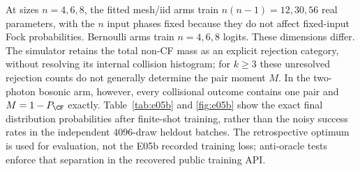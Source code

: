 At sizes $n=4,6,8$, the fitted mesh/iid arms train $n(n-1)=12,30,56$ real parameters, with the $n$ input phases fixed because they do not affect fixed-input Fock probabilities. Bernoulli arms train $n=4,6,8$ logits. These dimensions differ. The simulator retains the total non-CF mass as an explicit rejection category, without resolving its internal collision histogram; for $k\ge3$ these unresolved rejection counts do not generally determine the pair moment $M$. In the two-photon bosonic arm, however, every collisional outcome contains one pair and $M=1-P_{\CF}$ exactly. Table~\ref{tab:e05b} and \cref{fig:e05b} show the exact final distribution probabilities after finite-shot training, rather than the noisy success rates in the independent 4096-draw heldout batches. The retrospective optimum is used for evaluation, not the E05b recorded training loss; anti-oracle tests enforce that separation in the recovered public training API.

